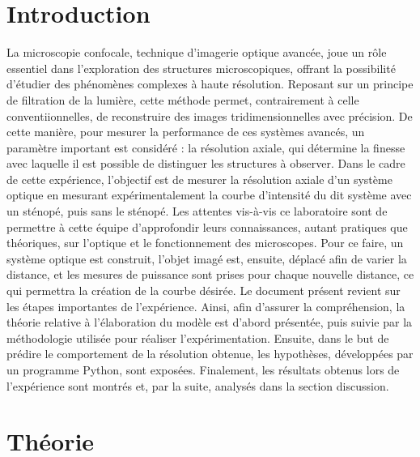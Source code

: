 \documentclass[11pt,letterpaper]{article}
\begin{document}
\section{Introduction}
La microscopie confocale, technique d'imagerie optique avancée, joue un rôle essentiel dans l'exploration des structures microscopiques, offrant la possibilité d'étudier des phénomènes complexes à haute résolution. Reposant sur un principe de filtration de la lumière, cette méthode permet, contrairement à celle conventiionnelles, de reconstruire des images tridimensionnelles avec précision. De cette manière, pour mesurer la performance de ces systèmes avancés, un paramètre important est considéré : la résolution axiale, qui détermine la finesse avec laquelle il est possible de distinguer les structures à observer. Dans le cadre de cette expérience, l'objectif est de mesurer la résolution axiale d'un système optique en mesurant expérimentalement la courbe d'intensité du dit système avec un sténopé, puis sans le sténopé. Les attentes vis-à-vis ce laboratoire sont de permettre à cette équipe d'approfondir leurs connaissances, autant pratiques que théoriques, sur l'optique et le fonctionnement des microscopes. Pour ce faire, un système optique est construit, l'objet imagé est, ensuite, déplacé afin de varier la distance, et les mesures de puissance sont prises pour chaque nouvelle distance, ce qui permettra la création de la courbe désirée. Le document présent revient sur les étapes importantes de l'expérience. Ainsi, afin d'assurer la compréhension, la théorie relative à l'élaboration du modèle est d'abord présentée, puis suivie par la méthodologie utilisée pour réaliser l'expérimentation. Ensuite, dans le but de prédire le comportement de la résolution obtenue, les hypothèses, développées par un programme Python, sont exposées. Finalement, les résultats obtenus lors de l'expérience sont montrés et, par la suite, analysés dans la section discussion.

\section{Théorie}
\end{document}
